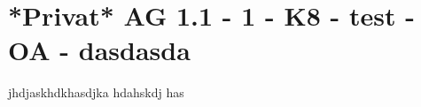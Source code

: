 \section{*Privat* AG 1.1 - 1 - K8 - test - OA - dasdasda}

\begin{beispiel}[AG 1.1]{1}
jhdjaskhdkhasdjka hdahskdj has
\end{beispiel}